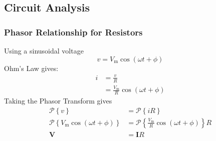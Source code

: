 \documentclass{article}
\begin{document}
\subsection{Circuit Analysis}
\subsubsection{Phasor Relationship for Resistors}
Using a sinusoidal voltage
\begin{equation*}
    v = V_{\mathrm{m}}\cos{\left( \omega t + \phi \right)}
\end{equation*}
Ohm's Law gives:
\begin{align*}
    i & = \frac{v}{R}                                                   \\
      & = \frac{V_{\mathrm{m}}}{R} \cos{\left( \omega t + \phi \right)}
\end{align*}
Taking the Phasor Transform gives
\begin{align*}
    \mathscr{P}\left\{ v \right\}                                                  & = \mathscr{P}\left\{ iR \right\}                                                              \\
    \mathscr{P}\left\{ V_{\mathrm{m}}\cos{\left( \omega t + \phi \right)} \right\} & = \mathscr{P}\left\{ \frac{V_{\mathrm{m}}}{R} \cos{\left( \omega t + \phi \right)} \right\} R \\
    \symbf{V}                                                                      & = \symbf{I} R
\end{align*}
\end{document}
